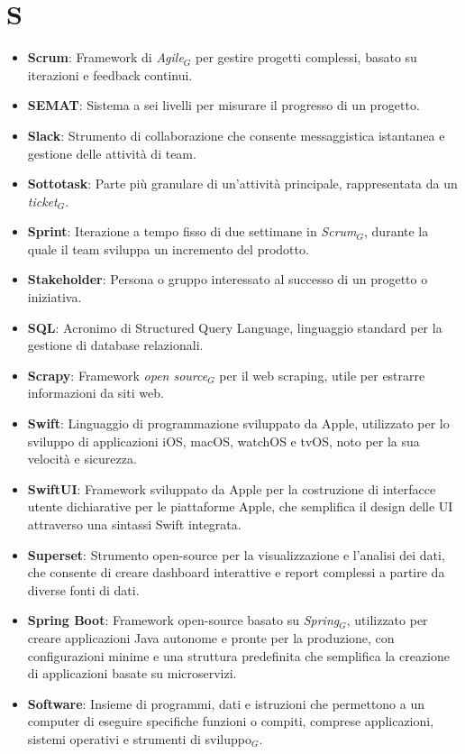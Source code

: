 \section{S}
\begin{itemize}
    \item \textbf{Scrum}: Framework di \textit{Agile}$_G$ per gestire progetti complessi, basato su iterazioni e feedback continui.
    \item \textbf{SEMAT}: Sistema a sei livelli per misurare il progresso di un progetto.
    \item \textbf{Slack}: Strumento di collaborazione che consente messaggistica istantanea e gestione delle attività di team.
    \item \textbf{Sottotask}: Parte più granulare di un’attività principale, rappresentata da un \textit{ticket}$_G$.
    \item \textbf{Sprint}: Iterazione a tempo fisso di due settimane in \textit{Scrum}$_G$, durante la quale il team sviluppa un incremento del prodotto.
    \item \textbf{Stakeholder}: Persona o gruppo interessato al successo di un progetto o iniziativa.
    \item \textbf{SQL}: Acronimo di Structured Query Language, linguaggio standard per la gestione di database relazionali.
    \item \textbf{Scrapy}: Framework \textit{open source}$_G$ per il web scraping, utile per estrarre informazioni da siti web.
    \item \textbf{Swift}: Linguaggio di programmazione sviluppato da Apple, utilizzato per lo sviluppo di applicazioni iOS, macOS, watchOS e tvOS, noto per la sua velocità e sicurezza.
\item \textbf{SwiftUI}: Framework sviluppato da Apple per la costruzione di interfacce utente dichiarative per le piattaforme Apple, che semplifica il design delle UI attraverso una sintassi Swift integrata.
\item \textbf{Superset}: Strumento open-source per la visualizzazione e l'analisi dei dati, che consente di creare dashboard interattive e report complessi a partire da diverse fonti di dati.
\item \textbf{Spring Boot}: Framework open-source basato su \textit{Spring}$_G$, utilizzato per creare applicazioni Java autonome e pronte per la produzione, con configurazioni minime e una struttura predefinita che semplifica la creazione di applicazioni basate su microservizi.
\item \textbf{Software}: Insieme di programmi, dati e istruzioni che permettono a un computer di eseguire specifiche funzioni o compiti, comprese applicazioni, sistemi operativi e strumenti di sviluppo$_G$.

\end{itemize}
